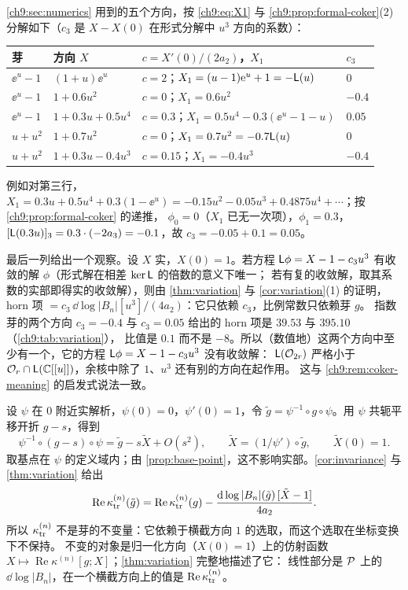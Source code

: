 \begin{example}[检验方向的分解]\label{ch9:ex:decompose}
\cref{ch9:sec:numerics} 用到的五个方向，按 \eqref{ch9:eq:X1} 与 \cref{ch9:prop:formal-coker}(2) 分解如下（$c_3$ 是 $X-X(0)$ 在形式分解中 $u^3$ 方向的系数）：
\begin{center}\small
\begin{tabular}{llll}
\toprule
芽 & 方向 $X$ & $c=X'(0)/(2a_2)$，$X_1$ & $c_3$\\
\midrule
$\ee^u-1$ & $(1+u)\ee^u$ & $c=2$；$X_1=(u-1)\mathrm{e}^u+1=-\mathsf L(u)$ & $0$\\
$\ee^u-1$ & $1+0.6u^2$ & $c=0$；$X_1=0.6u^2$ & $-0.4$\\
$\ee^u-1$ & $1+0.3u+0.5u^4$ & $c=0.3$；$X_1=0.5u^4-0.3(\ee^u-1-u)$ & $0.05$\\
$u+u^2$ & $1+0.7u^2$ & $c=0$；$X_1=0.7u^2=-0.7\mathsf L(u)$ & $0$\\
$u+u^2$ & $1+0.3u-0.4u^3$ & $c=0.15$；$X_1=-0.4u^3$ & $-0.4$\\
\bottomrule
\end{tabular}
\end{center}
例如对第三行，$X_1=0.3u+0.5u^4+0.3(1-\ee^u)=-0.15u^2-0.05u^3+0.4875u^4+\cdots$；按 \cref{ch9:prop:formal-coker} 的递推，
$\phi_0=0$（$X_1$ 已无一次项），$\phi_1=0.3$，$[\mathsf L(0.3u)]_3=0.3\cdot(-2a_3)=-0.1$，故 $c_3=-0.05+0.1=0.05$。

最后一列给出一个观察。设 $X$ 实，$X(0)=1$。若方程 $\mathsf L\phi=X-1-c_3u^3$ 有收敛的解 $\phi$（形式解在相差 $\ker\mathsf L$ 的倍数的意义下唯一；
若有复的收敛解，取其系数的实部即得实的收敛解），则由 \cref{thm:variation} 与 \cref{cor:variation}(1) 的证明，
horn 项 $=c_3\,\dd\log|B_n|[u^3]/(4a_2)$：它只依赖 $c_3$，比例常数只依赖芽 $g$。
指数芽的两个方向 $c_3=-0.4$ 与 $c_3=0.05$ 给出的 horn 项是 $39.53$ 与 $395.10$（\cref{ch9:tab:variation}），
比值是 $0.1$ 而不是 $-8$。所以（数值地）这两个方向中至少有一个，它的方程 $\mathsf L\phi=X-1-c_3u^3$ 没有收敛解：
$\mathsf L(\mathcal O_{2r})$ 严格小于 $\mathcal O_r\cap\mathsf L(\mathbb{C}[[u]])$，余核中除了 $1$、$u^3$ 还有别的方向在起作用。
这与 \cref{ch9:rem:coker-meaning} 的启发式说法一致。
\end{example}

\begin{remark}\label{rem:cocycle}
设 $\psi$ 在 $0$ 附近实解析，$\psi(0)=0$，$\psi'(0)=1$，令 $\tilde g=\psi^{-1}\circ g\circ\psi$。用 $\psi$ 共轭平移开折 $g-s$，得到
\[
 \psi^{-1}\circ(g-s)\circ\psi=\tilde g-s\tilde X+O(s^2),\qquad \tilde X=(1/\psi')\circ\tilde g,\qquad \tilde X(0)=1 .
\]
取基点在 $\psi$ 的定义域内；由 \cref{prop:base-point}，这不影响实部。\cref{cor:invariance} 与 \cref{thm:variation} 给出
\[
 \operatorname{Re}\kappa_{\mathrm{tr}}^{(n)}(\tilde g)=\operatorname{Re}\kappa_{\mathrm{tr}}^{(n)}(g)-\frac{\mathrm{d}\log|B_n|(\tilde g)\,[\tilde X-1]}{4a_2} .
\]
所以 $\kappa_{\mathrm{tr}}^{(n)}$ 不是芽的不变量：它依赖于横截方向 $1$ 的选取，而这个选取在坐标变换下不保持。
不变的对象是归一化方向（$X(0)=1$）上的仿射函数 $X\mapsto\operatorname{Re}\kappa^{(n)}[g;X]$；\cref{thm:variation} 完整地描述了它：
线性部分是 $\mathcal P$ 上的 $\dd\log|B_n|$，在一个横截方向上的值是 $\operatorname{Re}\kappa_{\mathrm{tr}}^{(n)}$。
\end{remark}

